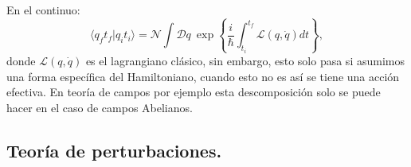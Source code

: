 En el continuo:
\begin{equation}
\langle q_{f}t_{f}|q_it_i\rangle=\mathcal{N}\int\mathcal{D}q\ \exp\left\{ \frac{i}{\hbar}\int_{t_{i}}^{t_{f}}\mathcal{L}(q,\dot{q})dt\right\} ,
\end{equation}
donde $\mathcal{L}(q,\dot{q})$ es el lagrangiano clásico, sin embargo, esto solo pasa si asumimos una forma específica del Hamiltoniano, cuando esto no es así se tiene una acción efectiva. En teoría de campos por ejemplo esta descomposición solo se puede hacer en el caso de campos Abelianos.
 
 

\subsection{Teoría de perturbaciones.}

